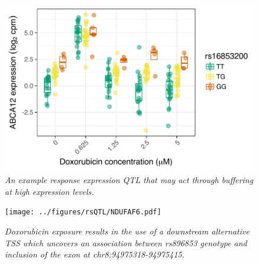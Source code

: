 \documentclass{article}
\begin{document}
\begin{figure}[h]
\begin{center}
    \includegraphics[width=.6\textwidth]{../figures/ABCA12.pdf} %
    \caption{\it{An example response expression QTL that may act through buffering at high expression levels.}}
    \label{fig:ABCA12}
    \end{center}
\end{figure}

\begin{figure}[h]
\begin{center}
    \texttt{[image: ../figures/rsQTL/NDUFAF6.pdf]} %
    \caption{\it{Doxorubicin exposure results in the use of a downstream alternative TSS which uncovers an association between rs896853 genotype and inclusion of the exon at chr8:94975318-94975415.}}
    \label{fig:NDUFAF6}
    \end{center}
\end{figure}

     
\end{document}
